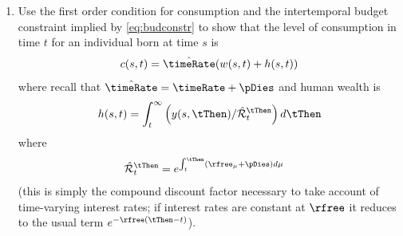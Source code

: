 \documentclass{handout}
\begin{document}
\begin{enumerate}
\item Use the first order condition for consumption and the 
intertemporal budget constraint implied by \eqref{eq:budconstr} to 
show that the level of consumption in time $t$ for an individual born 
at time $s$ is
\begin{displaymath}
        c(s,t) = \hat{\timeRate}(w(s,t)+h(s,t))
\end{displaymath}
where recall that $\hat{\timeRate}=\timeRate+\pDies$ and human wealth is
\begin{displaymath}
        h(s,t) = \int_{t}^{\infty} \left(y(s,\tThen)/\hat{\mathcal{R}}_{t}^{\tThen}\right) d\tThen
\end{displaymath}
where
\begin{equation}\begin{gathered}\begin{aligned}
  \hat{\mathcal{R}}_{t}^{\tThen} & =  e^{\int_{t}^{\tThen} (\rfree_{\mu}+\pDies) d\mu}
\end{aligned}\end{gathered}\end{equation}
(this is simply the compound discount factor necessary to take
account of time-varying interest rates; if interest rates are
constant at $\rfree$ it reduces to the usual term $e^{-\rfree(\tThen-t)}$).

\end{enumerate}
\end{document}
